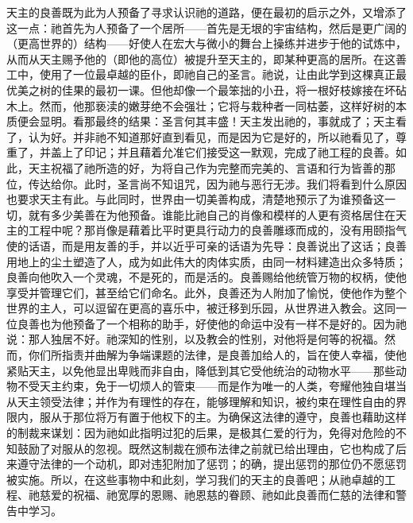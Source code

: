 天主的良善既为此为人预备了寻求认识祂的道路，便在最初的启示之外，又增添了这一点：祂首先为人预备了一个居所——首先是无垠的宇宙结构，然后是更广阔的（更高世界的）结构——好使人在宏大与微小的舞台上操练并进步于他的试炼中，从而从天主赐予他的（即他的高位）被提升至天主的，即某种更高的居所。在这善工中，使用了一位最卓越的臣仆，即祂自己的圣言。祂说，让由此学到这棵真正最优美之树的佳果的最初一课。但他却像一个最笨拙的小丑，将一根好枝嫁接在坏砧木上。然而，他那亵渎的嫩芽绝不会强壮；它将与栽种者一同枯萎，这样好树的本质便会显明。看那最终的结果：圣言何其丰盛！天主发出祂的，事就成了；天主看了，认为好。并非祂不知道那好直到看见，而是因为它是好的，所以祂看见了，尊重了，并盖上了印记；并且藉着允准它们接受这一默观，完成了祂工程的良善。如此，天主祝福了祂所造的好，为将自己作为完整而完美的、言语和行为皆善的那位，传达给你。此时，圣言尚不知诅咒，因为祂与恶行无涉。我们将看到什么原因也要求天主有此。与此同时，世界由一切美善构成，清楚地预示了为谁预备这一切，就有多少美善在为他预备。谁能比祂自己的肖像和模样的人更有资格居住在天主的工程中呢？那肖像是藉着比平时更具行动力的良善雕琢而成的，没有用颐指气使的话语，而是用友善的手，并以近乎可亲的话语为先导：良善说出了这话；良善用地上的尘土塑造了人，成为如此伟大的肉体实质，由同一材料建造出众多特质；良善向他吹入一个灵魂，不是死的，而是活的。良善赐给他统管万物的权柄，使他享受并管理它们，甚至给它们命名。此外，良善还为人附加了愉悦，使他作为整个世界的主人，可以逗留在更高的喜乐中，被迁移到乐园，从世界进入教会。这同一位良善也为他预备了一个相称的助手，好使他的命运中没有一样不是好的。因为祂说：那人独居不好。祂深知的性别，以及教会的性别，对他将是何等的祝福。然而，你们所指责并曲解为争端课题的法律，是良善加给人的，旨在使人幸福，使他紧贴天主，以免他显出卑贱而非自由，降低到其它受他统治的动物水平——那些动物不受天主约束，免于一切烦人的管束——而是作为唯一的人类，夸耀他独自堪当从天主领受法律；并作为有理性的存在，能够理解和知识，被约束在理性自由的界限内，服从于那位将万有置于他权下的主。为确保这法律的遵守，良善也藉助这样的制裁来谋划：因为祂如此指明过犯的后果，是极其仁爱的行为，免得对危险的不知鼓励了对服从的忽视。既然这制裁在颁布法律之前就已给出理由，它也构成了后来遵守法律的一个动机，即对违犯附加了惩罚；的确，提出惩罚的那位仍不愿惩罚被实施。所以，在这些事物中和此刻，学习我们的天主的良善吧；从祂卓越的工程、祂慈爱的祝福、祂宽厚的恩赐、祂恩慈的眷顾、祂如此良善而仁慈的法律和警告中学习。\par

